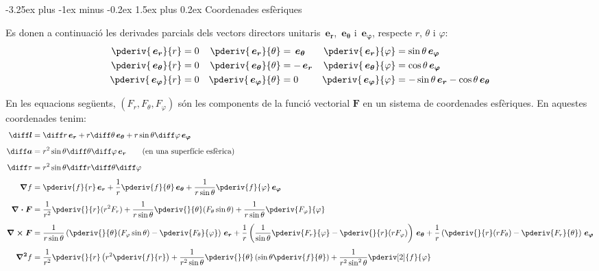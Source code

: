 \documentclass[catalan,a4paper,twoside,11pt]{article}
\makeatletter
\renewcommand{\subsection}{\@startsection {subsection}{2}{0pt}%
	{-3.25ex plus -1ex minus -0.2ex}%
	{1.5ex plus 0.2ex}%
	{\large  \sffamily  \bfseries}}
\makeatother
\begin{document}
\subsection{Coordenades esfèriques}

\renewcommand{\va}{\ensuremath{\,\boldsymbol{e_r}}}
\renewcommand{\vb}{\ensuremath{\,\boldsymbol{e_\theta}}}
\renewcommand{\vc}{\ensuremath{\,\boldsymbol{e_\varphi}}}

Es donen a continuació les derivades parcials dels vectors directors unitaris $\va$, $\vb$ i $\vc$, respecte  $r$, $\theta$ i $\varphi$:
\begin{subequations}
\begin{align}
   \pderiv{\va}{r} &= 0 & \pderiv{\va}{\theta} &= \vb  & \pderiv{\va}{\varphi} &= \sin\theta\vc \\
   \pderiv{\vb}{r} &= 0 & \pderiv{\vb}{\theta} &= -\va & \pderiv{\vb}{\varphi} &= \cos\theta\vc \\
   \pderiv{\vc}{r} &= 0 & \pderiv{\vc}{\theta} &= 0    & \pderiv{\vc}{\varphi} &= -\sin\theta\va-\cos\theta\vb
\end{align}
\end{subequations}

En les equacions següents, $(F_r,F_\theta,F_\varphi)$  són
les components de la funció  vectorial  $\boldsymbol{F}$ en un sistema de
coordenades esfèriques. En aquestes coordenades tenim:
\begin{align}
    \boldsymbol{\diff l} &= \diff r \va + r\diff\theta \vb + r \sin\theta\diff \varphi \vc\\[1ex]
    \boldsymbol{\diff a} &= r^2 \sin\theta \diff \theta \diff \varphi \va\qquad\text{(en una superfície esfèrica)}\\[1ex]
    \diff\tau &= r^2 \sin\theta\diff r \diff \theta \diff \varphi\\[1ex]
    \boldsymbol{\nabla}f &= \pderiv{f}{r}\va + \frac{1}{r}\pderiv{f}{\theta}\vb
    + \frac{1}{r\sin\theta}\pderiv{f}{\varphi}\vc\\[1ex]
    \boldsymbol{\nabla\cdot F} &= \frac{1}{r^2}\pderiv{}{r}(r^2 F_r) +
    \frac{1}{r\sin\theta}\pderiv{}{\theta}(F_\theta\sin\theta)+
    \frac{1}{r\sin\theta}\pderiv{F_\varphi}{\varphi}\\[1ex]
    \boldsymbol{\nabla\times F} &= \frac{1}{r\sin\theta}\left(\pderiv{}{\theta}
    (F_\varphi\sin\theta)-\pderiv{F_\theta}{\varphi}\right)\va +
    \frac{1}{r}\left(\frac{1}{\sin\theta}\pderiv{F_r}{\varphi}-
    \pderiv{}{r}(r F_\varphi)\right)\vb +\frac{1}{r}\left(\pderiv{}{r}(r F_\theta)-\pderiv{F_r}{\theta}\right)\vc\\[1ex]
    \boldsymbol{\nabla^2}f &= \frac{1}{r^2}\pderiv{}{r}\left(r^2\pderiv{f}{r}
    \right) + \frac{1}{r^2\sin\theta}\pderiv{}{\theta}\left(\sin\theta\pderiv{f}{\theta}\right) +
    \frac{1}{r^2\sin^2\theta}\pderiv[2]{f}{\varphi}
\end{align}
\end{document}
